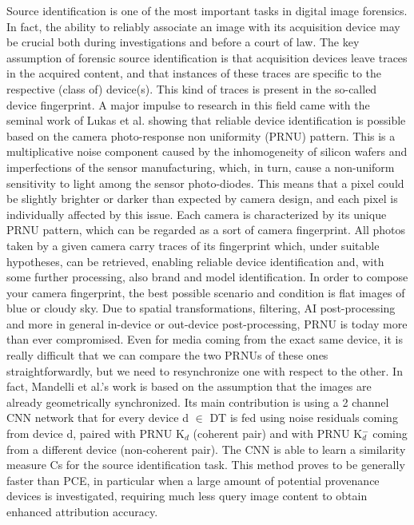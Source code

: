 Source identification is one of the most important tasks in digital image forensics. 
In fact, the ability to reliably associate an image with its acquisition device may be crucial both during investigations and before a court of law.
The key assumption of forensic source identification is that acquisition devices leave traces in the acquired content, and that instances of these traces are specific to the respective (class of) device(s). 
This kind of traces is present in the so-called device fingerprint.
A major impulse to research in this field came with the seminal work of Lukas et al. showing that reliable device identification is possible based on the camera photo-response non uniformity (PRNU) pattern. 
This is a multiplicative noise component caused by the inhomogeneity of silicon wafers and imperfections of the sensor manufacturing, which, in turn, cause a non-uniform sensitivity to light among the sensor photo-diodes. 
This means that a pixel could be slightly brighter or darker than expected by camera design, and each pixel is individually affected by this issue. Each camera is characterized by its unique PRNU pattern, which can be regarded as a sort of camera fingerprint.
All photos taken by a given camera carry traces of its fingerprint which, under suitable hypotheses, can be retrieved, enabling reliable device identification and, with some further processing, also brand and model identification.
In order to compose your camera fingerprint, the best possible scenario and condition is flat images of blue or cloudy sky.
Due to spatial transformations, filtering, AI post-processing and more in general in-device or out-device post-processing, PRNU is today more than ever compromised. 
Even for media coming from the exact same device, it is really difficult that we can compare the two PRNUs of these ones straightforwardly, but we need to resynchronize one with respect to the other.
In fact, Mandelli et al.'s work is based on the assumption that the images are already geometrically synchronized.
Its main contribution is using a 2 channel CNN network that for every device d $\in$ DT is fed using noise residuals coming from device d, paired with PRNU K$_{d}$ (coherent pair) and with PRNU K$_{d}^{-}$ coming from a different device (non-coherent pair). 
The CNN is able to learn a similarity measure Cs for the source identification task.
This method proves to be generally faster than PCE, in particular when a large amount of potential provenance devices is investigated, requiring much less query image content to obtain enhanced attribution accuracy.

